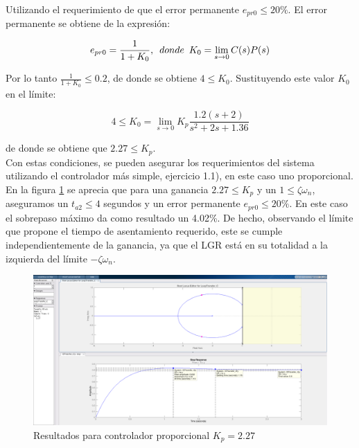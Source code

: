 \documentclass{report}
\begin{document}
Utilizando el requerimiento de que el error permanente \(e_{pr0} \leqslant 20\%\). El error permanente se obtiene de la 
expresión:

\begin{equation*}
    e_{pr0} = \frac{1}{1+K_0},\enskip donde \enskip K_0 = \lim_{s\to0} C(s)P(s) 
\label{E:7}
\end{equation*}

Por lo tanto \(\frac{1}{1+K_0} \leqslant 0.2\), de donde se obtiene \(4 \leqslant K_0\). Sustituyendo este valor \(K_0\) en 
el límite:

\begin{equation*}
    4 \leqslant K_0 = \lim_{s\to0} K_p\frac{1.2(s+2)}{s^2+2s+1.36} 
\label{E:8}
\end{equation*}

de donde se obtiene que \(2.27 \leqslant K_p\). \\

Con estas condiciones, se pueden asegurar los requerimientos del sistema utilizando el controlador más simple, ejercicio 1.1), en este 
caso uno proporcional. En la figura \ref{F:1} se aprecia que para una ganancia \(2.27 \leqslant K_p\) y un \(1 \leqslant 
\zeta \omega_n\), aseguramos un \(t_{a2} \leqslant 4\) segundos y un error permanente \(e_{pr0} \leqslant 20\% \). En este 
caso el sobrepaso máximo da como resultado un 4.02\%. De hecho, observando el límite que propone el tiempo de 
asentamiento requerido, este se cumple independientemente de la ganancia, ya que el LGR está en su totalidad a la 
izquierda del límite \(-\zeta \omega_n\).

\begin{figure}[h!]
\centering  
\includegraphics[width=1\textwidth]{P1_1.png}
\caption{Resultados para controlador proporcional \(K_p = 2.27\)}
\label{F:1}
\end{figure}
\end{document}
